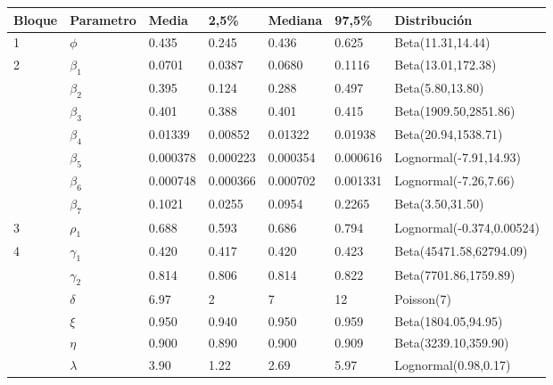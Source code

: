 \documentclass[12pt]{article}
\begin{document}
\begin{table}[]
\begin{tabular}{|l|l|l|l|l|l|l|}
\hline
Bloque             & Parametro  & Media    & 2,5\%    & Mediana  & 97,5\%   & Distribución              \\ \hline
1                  & $\phi$     & 0.435    & 0.245    & 0.436    & 0.625    & Beta(11.31,14.44)         \\ \hline
\multirow{7}{*}{2} & $\beta_1$  & 0.0701   & 0.0387   & 0.0680   & 0.1116   & Beta(13.01,172.38)        \\ \cline{2-7} 
                   & $\beta_2$  & 0.395    & 0.124    & 0.288    & 0.497    & Beta(5.80,13.80)          \\ \cline{2-7} 
                   & $\beta_3$  & 0.401    & 0.388    & 0.401    & 0.415    & Beta(1909.50,2851.86)     \\ \cline{2-7} 
                   & $\beta_4$  & 0.01339  & 0.00852  & 0.01322  & 0.01938  & Beta(20.94,1538.71)       \\ \cline{2-7} 
                   & $\beta_5$  & 0.000378 & 0.000223 & 0.000354 & 0.000616 & Lognormal(-7.91,14.93)    \\ \cline{2-7} 
                   & $\beta_6$  & 0.000748 & 0.000366 & 0.000702 & 0.001331 & Lognormal(-7.26,7.66)     \\ \cline{2-7} 
                   & $\beta_7$  & 0.1021   & 0.0255   & 0.0954   & 0.2265   & Beta(3.50,31.50)          \\ \hline
3                  & $\rho_1$   & 0.688    & 0.593    & 0.686    & 0.794    & Lognormal(-0.374,0.00524) \\ \hline
\multirow{6}{*}{4} & $\gamma_1$ & 0.420    & 0.417    & 0.420    & 0.423    & Beta(45471.58,62794.09)   \\ \cline{2-7} 
                   & $\gamma_2$ & 0.814    & 0.806    & 0.814    & 0.822    & Beta(7701.86,1759.89)     \\ \cline{2-7} 
                   & $\delta$   & 6.97     & 2        & 7        & 12       & Poisson(7)                \\ \cline{2-7} 
                   & $\xi$      & 0.950    & 0.940    & 0.950    & 0.959    & Beta(1804.05,94.95)       \\ \cline{2-7} 
                   & $\eta$     & 0.900    & 0.890    & 0.900    & 0.909    & Beta(3239.10,359.90)      \\ \cline{2-7} 
                   & $\lambda$  & 3.90     & 1.22     & 2.69     & 5.97     & Lognormal(0.98,0.17)      \\ \hline

\end{tabular}
\end{table}
\end{document}
